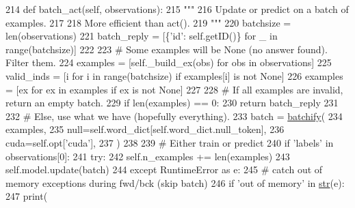 \begin{DoxyCode}
214     \textcolor{keyword}{def }batch\_act(self, observations):
215         \textcolor{stringliteral}{"""}
216 \textcolor{stringliteral}{        Update or predict on a batch of examples.}
217 \textcolor{stringliteral}{}
218 \textcolor{stringliteral}{        More efficient than act().}
219 \textcolor{stringliteral}{        """}
220         batchsize = len(observations)
221         batch\_reply = [\{\textcolor{stringliteral}{'id'}: self.getID()\} \textcolor{keywordflow}{for} \_ \textcolor{keywordflow}{in} range(batchsize)]
222 
223         \textcolor{comment}{# Some examples will be None (no answer found). Filter them.}
224         examples = [self.\_build\_ex(obs) \textcolor{keywordflow}{for} obs \textcolor{keywordflow}{in} observations]
225         valid\_inds = [i \textcolor{keywordflow}{for} i \textcolor{keywordflow}{in} range(batchsize) \textcolor{keywordflow}{if} examples[i] \textcolor{keywordflow}{is} \textcolor{keywordflow}{not} \textcolor{keywordtype}{None}]
226         examples = [ex \textcolor{keywordflow}{for} ex \textcolor{keywordflow}{in} examples \textcolor{keywordflow}{if} ex \textcolor{keywordflow}{is} \textcolor{keywordflow}{not} \textcolor{keywordtype}{None}]
227 
228         \textcolor{comment}{# If all examples are invalid, return an empty batch.}
229         \textcolor{keywordflow}{if} len(examples) == 0:
230             \textcolor{keywordflow}{return} batch\_reply
231 
232         \textcolor{comment}{# Else, use what we have (hopefully everything).}
233         batch = \hyperlink{namespaceparlai_1_1agents_1_1drqa_1_1utils_aca22dd97c5b6dcda2a7479c1cb22ef1e}{batchify}(
234             examples,
235             null=self.word\_dict[self.word\_dict.null\_token],
236             cuda=self.opt[\textcolor{stringliteral}{'cuda'}],
237         )
238 
239         \textcolor{comment}{# Either train or predict}
240         \textcolor{keywordflow}{if} \textcolor{stringliteral}{'labels'} \textcolor{keywordflow}{in} observations[0]:
241             \textcolor{keywordflow}{try}:
242                 self.n\_examples += len(examples)
243                 self.model.update(batch)
244             \textcolor{keywordflow}{except} RuntimeError \textcolor{keyword}{as} e:
245                 \textcolor{comment}{# catch out of memory exceptions during fwd/bck (skip batch)}
246                 \textcolor{keywordflow}{if} \textcolor{stringliteral}{'out of memory'} \textcolor{keywordflow}{in} \hyperlink{namespacegenerate__task__READMEs_a5b88452ffb87b78c8c85ececebafc09f}{str}(e):
247                     print(

\end{DoxyCode}
